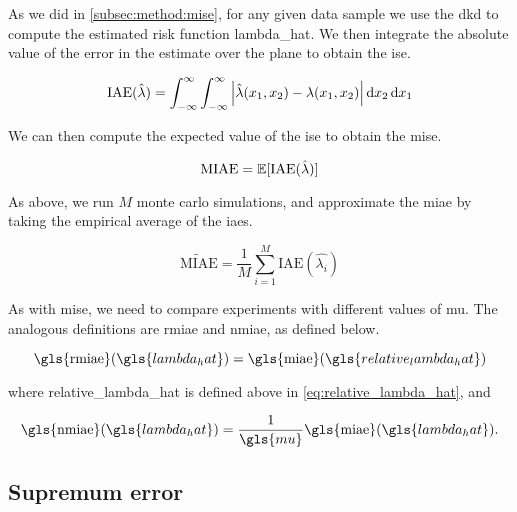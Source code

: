 As we did in \autoref{subsec:method:mise}, for any given data sample we use the \gls{dkd} to compute the estimated risk function \gls{lambda_hat}.
We then integrate the absolute value of the error in the estimate over the plane to obtain the \gls{ise}.

\begin{equation}
    \mbox{IAE}(\hat{\lambda}) = 
        \int_{-\infty}^{\infty} \int_{-\infty}^{\infty}
            \left|
                \hat{\lambda}(x_1, x_2) - \lambda(x_1, x_2)
            \right| \mathop{}\!\mathrm{d}{x_2} \mathop{}\!\mathrm{d}{x_1}
\end{equation}

We can then compute the expected value of the \gls{ise} to obtain the \gls{mise}.

\begin{equation}
    \mbox{MIAE} = \mathbb{E} [\mbox{IAE}(\hat{\lambda})]
\end{equation}

As above, we run $M$ monte carlo simulations,
and approximate the \gls{miae} by taking the empirical average of the \glspl{iae}.

\begin{equation}
    \widetilde{\mbox{MIAE}} = \frac{1}{M} \sum_{i=1}^{M} \mbox{IAE}(\hat{\lambda_i})
\end{equation}

As with \gls{mise}, we need to compare experiments with different values of \gls{mu}.
The analogous definitions are \gls{rmiae} and \gls{nmiae}, as defined below.

\begin{equation}
\label{eq:rmiae}
    \mbox{\gls{rmiae}}(\gls{lambda_hat}) = 
        \mbox{\gls{miae}}(\gls{relative_lambda_hat}) \\
\end{equation}

where \gls{relative_lambda_hat} is defined above in \cref{eq:relative_lambda_hat},
and

\begin{equation}
\label{eq:nmiae}
    \mbox{\gls{nmiae}}(\gls{lambda_hat}) = 
        \frac{1}{\gls{mu}} \mbox{\gls{miae}}(\gls{lambda_hat}) \text{.}
\end{equation}


\subsection{Supremum error}
\label{subsec:method:sup_error}

